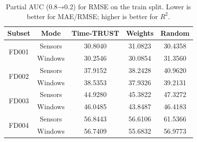 \begin{table}[t]
\centering
\caption{Partial AUC (0.8→0.2) for RMSE on the train split. Lower is better for MAE/RMSE; higher is better for $R^2$.}
\label{tab:auc_rmse_train}
\begin{tabular}{|c|c|c|c|c|}
\hline
Subset & Mode & Time-TRUST & Weights & Random \\
\hline
\multirow{2}{*}{FD001} & Sensors & 30.8040 & 31.0823 & 30.4358 \\
 & Windows & 30.2546 & 30.0854 & 31.3560 \\
\hline
\multirow{2}{*}{FD002} & Sensors & 37.9152 & 38.2428 & 40.9620 \\
 & Windows & 38.5353 & 37.9326 & 39.2131 \\
\hline
\multirow{2}{*}{FD003} & Sensors & 44.9280 & 45.3822 & 47.3272 \\
 & Windows & 46.0485 & 43.8487 & 46.4183 \\
\hline
\multirow{2}{*}{FD004} & Sensors & 56.8443 & 56.6106 & 61.5366 \\
 & Windows & 56.7409 & 55.6832 & 56.9773 \\
\hline
\end{tabular}
\end{table}
